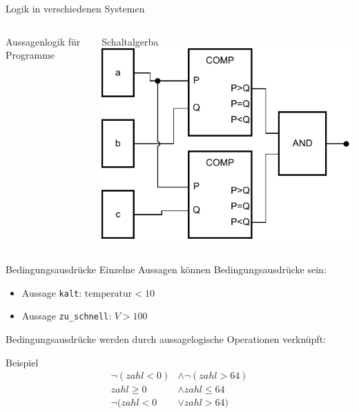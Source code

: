 \documentclass[xelatex,aspectratio=169]{beamer}
\begin{document}
\begin{frame}{Logik in verschiedenen Systemen}
  \vspace{-1em}
  \begin{columns}
    \begin{column}{0.5\textwidth}
      \begin{block}{Aussagenlogik für Programme}
        \inputminted[firstline=5,lastline=8]{python}{src/logik_example.py}
      \end{block}
    \end{column}
    \begin{column}{0.5\textwidth}
      \begin{block}{Schaltalgerba}
        \includegraphics[width=\textwidth]{fig/logik_schaltalgebra.pdf}
      \end{block}
    \end{column}
  \end{columns}
  \vspace{1em}
\end{frame}

\begin{frame}{Bedingungsausdrücke}
  Einzelne Aussagen können Bedingungsausdrücke sein:
  \begin{itemize}
    \item[~] Aussage \texttt{kalt}: \(\mbox{temperatur} < 10\)
    \item[~] Aussage \texttt{zu\_schnell}: \(V > 100\)
  \end{itemize}

  Bedingungsausdrücke werden durch aussagelogische Operationen verknüpft:

  \begin{exampleblock}{Beispiel}
    \begin{align*}
      \lnot \left( zahl < 0 \right) & \land \lnot (zahl > 64) \\
      zahl \geq 0                   & \land zahl \leq 64      \\
      \lnot ( zahl < 0              & \lor zahl > 64 )
    \end{align*}
  \end{exampleblock}

\end{frame}
\end{document}
